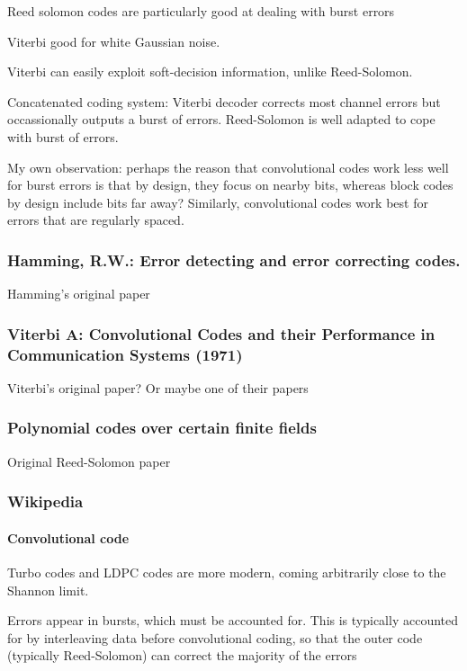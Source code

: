 \documentclass{article}
\begin{document}
Reed solomon codes are particularly good at dealing with burst errors

Viterbi good for white Gaussian noise.

Viterbi can easily exploit soft-decision information, unlike Reed-Solomon.

Concatenated coding system: Viterbi decoder corrects most channel errors but occassionally outputs a burst of errors. Reed-Solomon is well adapted to cope with burst of errors.

My own observation: perhaps the reason that convolutional codes work less well for burst errors is that by design, they focus on nearby bits, whereas block codes by design include bits far away? Similarly, convolutional codes work best for errors that are regularly spaced.

\subsubsection{Hamming, R.W.: Error detecting and error correcting codes.}

Hamming's original paper

\subsubsection{Viterbi A: Convolutional Codes and their Performance in
Communication Systems (1971)}

Viterbi's original paper? Or maybe one of their papers

\subsubsection{Polynomial codes over certain finite fields}

Original Reed-Solomon paper

\subsubsection{Wikipedia}

\paragraph{Convolutional code} Turbo codes and LDPC codes are more modern, coming arbitrarily close to the Shannon limit.

Errors appear in bursts, which must be accounted for. This is typically accounted for by interleaving data before convolutional coding, so that the outer code (typically Reed-Solomon) can correct the majority of the errors
\end{document}
